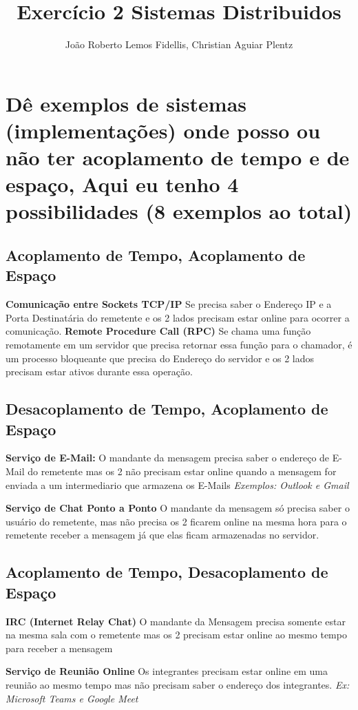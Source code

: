 \documentclass[12pt]{article}
\title{Exercício 2 Sistemas Distribuidos}
\author{João Roberto Lemos Fidellis\inst{1}, Christian Aguiar Plentz\inst{2} }
\begin{document}
 

\maketitle

\section{Dê exemplos de sistemas (implementações) onde posso ou não ter
acoplamento de tempo e de  espaço, Aqui eu tenho 4 possibilidades (8 exemplos ao total)}
\label{sec:exercicio1}

\subsection{Acoplamento de Tempo, Acoplamento de Espaço}
\textbf{Comunicação entre Sockets TCP/IP} 
Se precisa saber o Endereço IP e a Porta Destinatária do remetente e os
    2 lados precisam estar online para ocorrer a comunicação.
\textbf{Remote Procedure Call (RPC)} 
Se chama uma função remotamente em um servidor que precisa retornar
    essa função para o chamador, é um processo bloqueante que precisa
    do Endereço do servidor e os 2 lados precisam estar ativos durante
    essa operação.

\subsection{Desacoplamento de Tempo, Acoplamento de Espaço}
\textbf{Serviço de E-Mail:} 
O mandante da mensagem precisa saber o endereço de E-Mail do remetente mas os 2
não precisam estar online quando a mensagem for enviada a um intermediario
que armazena os E-Mails 
\textit{Exemplos: Outlook e Gmail}


\noindent \textbf{Serviço de Chat Ponto a Ponto} 
O mandante da mensagem só precisa saber o usuário do remetente, mas não precisa os 2 ficarem
online na mesma hora para o remetente receber a mensagem
já que elas ficam armazenadas no servidor.

\subsection{Acoplamento de Tempo, Desacoplamento de Espaço}
\textbf{IRC (Internet Relay Chat)}
O mandante da Mensagem precisa somente estar na mesma sala com o remetente mas
os 2 precisam estar online ao mesmo tempo para receber a mensagem

\noindent \textbf{Serviço de Reunião Online}
Os integrantes precisam estar online em uma reunião ao mesmo tempo mas não precisam
saber o endereço dos integrantes.
\textit{Ex: Microsoft Teams e Google Meet}
\end{document}
